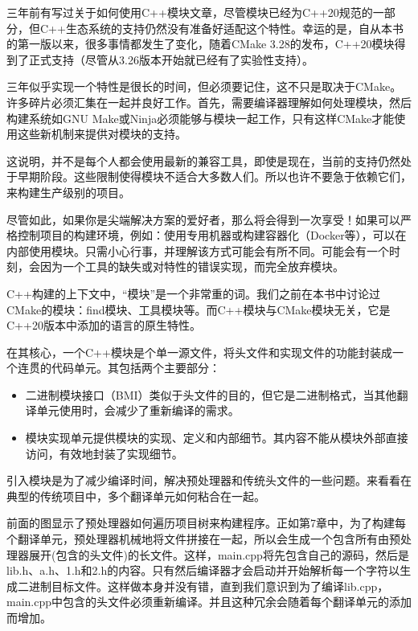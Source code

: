 三年前有写过关于如何使用C++模块文章，尽管模块已经为C++20规范的一部分，但C++生态系统的支持仍然没有准备好适配这个特性。幸运的是，自从本书的第一版以来，很多事情都发生了变化，随着CMake 3.28的发布，C++20模块得到了正式支持（尽管从3.26版本开始就已经有了实验性支持）。

三年似乎实现一个特性是很长的时间，但必须要记住，这不只是取决于CMake。许多碎片必须汇集在一起并良好工作。首先，需要编译器理解如何处理模块，然后构建系统如GNU Make或Ninja必须能够与模块一起工作，只有这样CMake才能使用这些新机制来提供对模块的支持。

这说明，并不是每个人都会使用最新的兼容工具，即使是现在，当前的支持仍然处于早期阶段。这些限制使得模块不适合大多数人们。所以也许不要急于依赖它们，来构建生产级别的项目。

尽管如此，如果你是尖端解决方案的爱好者，那么将会得到一次享受！如果可以严格控制项目的构建环境，例如：使用专用机器或构建容器化（Docker等），可以在内部使用模块。只需小心行事，并理解该方式可能会有所不同。可能会有一个时刻，会因为一个工具的缺失或对特性的错误实现，而完全放弃模块。

C++构建的上下文中，“模块”是一个非常重的词。我们之前在本书中讨论过CMake的模块：find模块、工具模块等。而C++模块与CMake模块无关，它是C++20版本中添加的语言的原生特性。

在其核心，一个C++模块是个单一源文件，将头文件和实现文件的功能封装成一个连贯的代码单元。其包括两个主要部分：

\begin{itemize}
\item
二进制模块接口（BMI）类似于头文件的目的，但它是二进制格式，当其他翻译单元使用时，会减少了重新编译的需求。

\item
模块实现单元提供模块的实现、定义和内部细节。其内容不能从模块外部直接访问，有效地封装了实现细节。
\end{itemize}

引入模块是为了减少编译时间，解决预处理器和传统头文件的一些问题。来看看在典型的传统项目中，多个翻译单元如何粘合在一起。


前面的图显示了预处理器如何遍历项目树来构建程序。正如第7章中，为了构建每个翻译单元，预处理器机械地将文件拼接在一起，所以会生成一个包含所有由预处理器展开(包含的头文件)的长文件。这样，main.cpp将先包含自己的源码，然后是lib.h、a.h、1.h和2.h的内容。只有然后编译器才会启动并开始解析每一个字符以生成二进制目标文件。这样做本身并没有错，直到我们意识到为了编译lib.cpp，main.cpp中包含的头文件必须重新编译。并且这种冗余会随着每个翻译单元的添加而增加。

